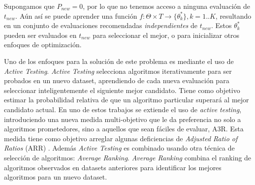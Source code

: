 
Supongamos que $P_{new} = 0$, por lo que no tenemos acceso a ninguna evaluación de $t_{new}$. Aún así se puede aprender una función $f: \Theta \times T \rightarrow \{\theta^*_k\}, k=1..K$, resultando en un conjunto de evaluaciones recomendadas \textit{independientes} de $t_{new}$. Estos $\theta^*_k$ pueden ser evaluados en $t_{new}$ para seleccionar el mejor, o para inicializar otros enfoques de optimización.

Uno de los enfoques para la solución de este problema es mediante el uso de \textit{Active Testing}\cite{leite2017selecting}. \textit{Active Testing} selecciona algoritmos iterativamente para ser probados en un nuevo dataset, aprendiendo de cada nueva evaluación para seleccionar inteligentemente el siguiente mejor candidato. Tiene como objetivo estimar la probabilidad relativa de que un algoritmo particular superará al mejor candidato actual. En uno de estos trabajos \cite{abdulrahman2018speeding} se extiende el uso de \textit{active testing}, introduciendo una nueva medida multi-objetivo que le da preferencia no solo a algoritmos prometedores, sino a aquellos que sean fáciles de evaluar, A3R. Esta medida tiene como objetivo arreglar algunas deficiencias de \textit{Adjusted Ratio of Ratios} (ARR) \cite{abdulrahman2014measures}. Además \textit{Active Testing} es combinado usando otra técnica de selección de algoritmos: \textit{Average Ranking}. \textit{Average Ranking} combina el ranking de algoritmos observados en datasets anteriores para identificar los mejores algoritmos para un nuevo dataset.

